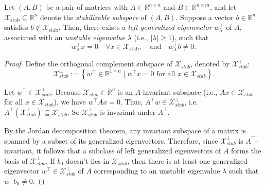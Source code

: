 \begin{lemma}
Let $(A, B)$ be a pair of matrices with $A \in \mathbb{R}^{n \times n}$ and $B \in \mathbb{R}^{n \times m}$, and let $\mathcal{X}_{\mathrm{stab}} \subseteq \mathbb{R}^n$ denote the \emph{stabilizable subspace} of $(A, B)$. Suppose a vector $b \in \mathbb{R}^n$ satisfies $b \notin \mathcal{X}_{\mathrm{stab}}$. Then, there exists a \emph{left generalized eigenvector} $w_\lambda^\top$ of $A$, associated with an \emph{unstable eigenvalue} $\lambda$ (i.e., $|\lambda| \ge 1$), such that
\[
w_\lambda^\top x = 0 \quad \forall x \in \mathcal{X}_{\mathrm{stab}}, \quad \text{and} \quad w_\lambda^\top b \ne 0.
\]


\end{lemma}
\begin{proof}
Define the orthogonal complement subspace of \(\mathcal{X}_{stab}\), denoted by \(\mathcal{X}_{stab}^\perp\):
\[
\mathcal{X}_{stab}^\perp := \left\{ w^\top \in \mathbb{R}^{1 \times n} \mid w^\top x = 0 \text{ for all } x \in \mathcal{X}_{stab} \right\}.
\]

Let \( w^\top \in \mathcal{X}_{stab}^\perp\).
Because \(\mathcal{X}_{stab} \in \mathbb{R}^n\) is an \( A \)-invariant subspace (i.e., \( A x \in \mathcal{X}_{stab} \) for all \( x \in \mathcal{X}_{stab} \)), we have \(w^\top A x = 0\). Thus, \( A^\top w \in \mathcal{X}_{stab}^\perp\), i.e. \(
A^\top (\mathcal{X}_{stab}^\perp) \subseteq \mathcal{X}_{stab}^\perp\).
So \( \mathcal{X}_{stab}^\perp \) is invariant under \( A^\top \).


By the Jordan decomposition theorem, any invariant subspace of a matrix is spanned by a subset of its generalized eigenvectors. Therefore, since \( \mathcal{X}_{stab}^\perp \) is \( A^\top \)-invariant, it follows that a subclass of left generalized eigenvectors of \(A\) forms the basis of \(\mathcal{X}_{stab}^\perp\).
If \(b_0\) doesn't lies in \(\mathcal{X}_{stab}\), then there is at least one generalized eigenvector \(w^\top\in \mathcal{X}_{stab}^\perp\) of \(A\) corresponding to an unstable eigenvalue \(\lambda\) such that \(w^\top b_0 \neq 0\).
\end{proof}

